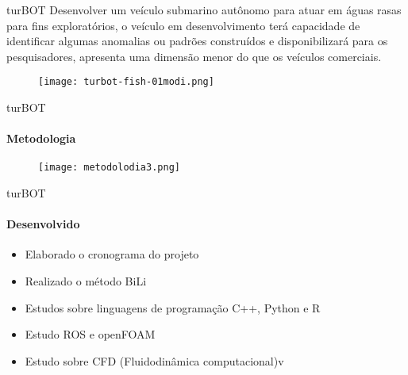\begin{frame}[c]{turBOT}
    Desenvolver um veículo submarino autônomo para atuar em águas rasas para fins exploratórios,
    o veículo em desenvolvimento terá capacidade de identificar algumas anomalias ou padrões construídos
    e disponibilizará para os pesquisadores, apresenta uma dimensão menor do que os veículos comerciais.
    \begin{figure}
        \texttt{[image: turbot-fish-01modi.png]}
    \end{figure}
    
\end{frame}
\begin{frame}[c]{turBOT }
    \framesubtitle{Metodologia}
        \begin{figure}
        \texttt{[image: metodolodia3.png]}
    \end{figure}
\end{frame}
\begin{frame}[t]{turBOT}
    \framesubtitle{Desenvolvido}
    \begin{itemize}
        \item Elaborado o cronograma do projeto
        \item Realizado o método BiLi
        \item Estudos sobre linguagens de programação C++, Python e R
        \item Estudo ROS e openFOAM
        \item Estudo sobre CFD (Fluidodinâmica computacional)v
    \end{itemize}    
\end{frame}
